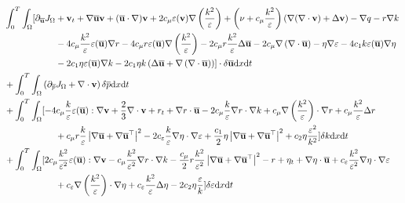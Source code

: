 \documentclass[oneside,11pt]{book}
\numberwithin{equation}{section}
\begin{document}
\begin{align*}
    &\int_0^T\int_\Omega [\partial_{\overline{\bf u}}J_\Omega + {\bf v}_t + \nabla\overline{\bf u}{\bf v} + (\overline{\bf u}\cdot\nabla){\bf v} + 2c_\mu\varepsilon({\bf v})\nabla\left(\frac{k^2}{\varepsilon}\right) + \left(\nu + c_\mu\frac{k^2}{\varepsilon}\right)\left(\nabla(\nabla\cdot{\bf v}) + \Delta{\bf v}\right) - \nabla q - r\nabla k\\
    &\hspace{2cm} - 4c_\mu\frac{k^2}{\varepsilon}\varepsilon(\overline{\bf u})\nabla r - 4c_\mu r\varepsilon(\overline{\bf u})\nabla\left(\frac{k^2}{\varepsilon}\right) - 2c_\mu r\frac{k^2}{\varepsilon}\Delta\overline{\bf u} - 2c_\mu\nabla\left(\nabla\cdot\overline{\bf u}\right) - \eta\nabla\varepsilon - 4c_1k\varepsilon(\overline{\bf u})\nabla\eta\\
    &\hspace{2cm} - 2c_1\eta\varepsilon(\overline{\bf u})\nabla k - 2c_1\eta k\left(\Delta\overline{\bf u} + \nabla\left(\nabla\cdot\overline{\bf u}\right)\right)]\cdot\delta\overline{\bf u}{\rm d}x{\rm d}t\\
    &+ \int_0^T\int_\Omega \left(\partial_{\overline{p}}J_\Omega + \nabla\cdot{\bf v}\right)\delta\overline{p}{\rm d}x{\rm d}t\\
    &+ \int_0^T\int_\Omega [-4c_\mu\frac{k}{\varepsilon}\varepsilon(\overline{\bf u}):\nabla{\bf v} + \frac{2}{3}\nabla\cdot{\bf v} + r_t + \nabla r\cdot\overline{\bf u} - 2c_\mu\frac{k}{\varepsilon}\nabla r\cdot\nabla k + c_\mu\nabla\left(\frac{k^2}{\varepsilon}\right)\cdot\nabla r + c_\mu\frac{k^2}{\varepsilon}\Delta r\\
    & \hspace{2cm} + c_\mu r\frac{k}{\varepsilon}\left|\nabla\overline{\bf u} + \nabla\overline{\bf u}^\top\right|^2 - 2c_\varepsilon\frac{k}{\varepsilon}\nabla\eta\cdot\nabla\varepsilon + \frac{c_1}{2}\eta\left|\nabla\overline{\bf u} + \nabla\overline{\bf u}^\top\right|^2 + c_2\eta\frac{\varepsilon^2}{k^2}]\delta k{\rm d}x{\rm d}t\\
    &+ \int_0^T\int_\Omega [2c_\mu\frac{k^2}{\varepsilon^2}\varepsilon(\overline{\bf u}):\nabla{\bf v} - c_\mu\frac{k^2}{\varepsilon^2}\nabla r\cdot\nabla k - \frac{c_\mu}{2}r\frac{k^2}{\varepsilon^2}\left|\nabla\overline{\bf u} + \nabla\overline{\bf u}^\top\right|^2 - r + \eta_t + \nabla\eta\cdot\overline{\bf u} + c_\varepsilon\frac{k^2}{\varepsilon^2}\nabla\eta\cdot\nabla\varepsilon\\
    &\hspace{2cm} + c_\varepsilon\nabla\left(\frac{k^2}{\varepsilon}\right)\cdot\nabla\eta + c_\varepsilon\frac{k^2}{\varepsilon}\Delta\eta - 2c_2\eta\frac{\varepsilon}{k}]\delta\varepsilon{\rm d}x{\rm d}t\\

\end{align*}
\end{document}
